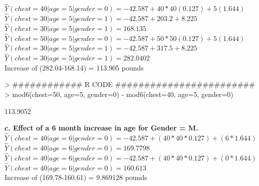 \documentclass{article}
\begin{document}
\noindent $\hat{Y}(chest=40|age=5|gender=0) = -42.587 + 40*40(0.127) + 5(1.644) $ \\ 
$\hat{Y}(chest=30|age=5|gender=1) = -42.587 + 203.2+ 8.225 $ \\ 
$\hat{Y}(chest=30|age=5|gender=1) = 168.135 $ \\ 

\noindent $\hat{Y}(chest=50|age=5|gender=0) = -42.587 + 50*50(0.127) + 5(1.644) $ \\ 
$\hat{Y}(chest=30|age=5|gender=1) = -42.587 + 317.5 + 8.225 $ \\ 
$\hat{Y}(chest=30|age=5|gender=1) = 282.0402 $ \\ 

\noindent Increase of (282.04-168.14) = 113.905 pounds\\ 



\begin{Schunk}
\begin{Sinput}
> ############ R CODE ########################
> mod6(chest=50, age=5, gender=0) - mod6(chest=40, age=5, gender=0) 
\end{Sinput}
\begin{Soutput}
[1] 113.9052
\end{Soutput}
\end{Schunk}

\noindent \textbf{c. Effect of a 6 month increase in age for Gender = M.} \\
\noindent $\hat{Y}(chest=40|age=6|gender=0) = -42.587 + (40*40*0.127) + (6*1.644) $ \\ 
$\hat{Y}(chest=40|age=6|gender=0) =  169.7798 $ \\ 

\noindent $\hat{Y}(chest=40|age=6|gender=0) = -42.587 + (40*40*0.127) + (0*1.644) $ \\ 
$\hat{Y}(chest=40|age=6|gender=0) =  160.613$ \\ 

\noindent Increase of (169.78-160.61) = 9.869128 pounds \\

\end{document}

